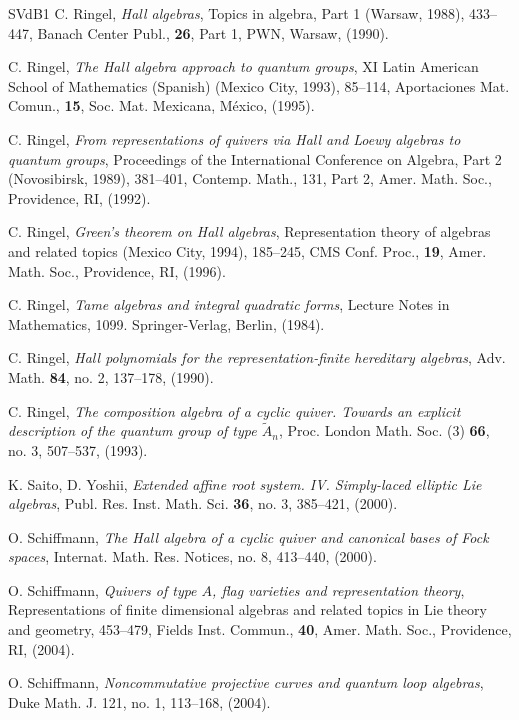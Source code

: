 \documentclass[a4paper,10pt]{amsart}
\numberwithin{equation}{section}
\begin{document}
{{\begin{thebibliography}{SVdB1}
C. Ringel, \emph{Hall algebras}, Topics in algebra, Part 1 (Warsaw, 1988), 433--447, Banach Center Publ., \textbf{26}, Part 1, PWN, Warsaw, (1990).

C. Ringel, \emph{The Hall algebra approach to quantum groups}, XI Latin American School of Mathematics (Spanish) (Mexico City, 1993), 85--114, Aportaciones Mat. Comun., \textbf{15}, Soc. Mat. Mexicana, M\'exico, (1995).

C. Ringel, \emph{From representations of quivers via Hall and Loewy algebras to quantum groups}, Proceedings of the International Conference on Algebra, Part 2 (Novosibirsk, 1989), 381--401, Contemp. Math., 131, Part 2, Amer. Math. Soc., Providence, RI, (1992).

C. Ringel, \emph{Green's theorem on Hall algebras}, Representation theory of algebras and related topics (Mexico City, 1994), 185--245, CMS Conf. Proc., \textbf{19}, Amer. Math. Soc., Providence, RI, (1996).

C. Ringel, \emph{Tame algebras and integral quadratic forms}, Lecture Notes in Mathematics, 1099. Springer-Verlag, Berlin, (1984).

C. Ringel, \emph{Hall polynomials for the representation-finite hereditary algebras}, Adv. Math. \textbf{84}, no. 2, 137--178, (1990).

C. Ringel, \emph{The composition algebra of a cyclic quiver. Towards an explicit description of the quantum group of type $\widetilde{A}_n$}, Proc. London Math. Soc. (3) \textbf{66}, no. 3, 507--537, (1993).

K. Saito, D. Yoshii, \emph{Extended affine root system. IV. Simply-laced elliptic Lie algebras}, Publ. Res. Inst. Math. Sci. \textbf{36}, no. 3, 385--421, (2000).

O. Schiffmann, \emph{The Hall algebra of a cyclic quiver and canonical bases of Fock spaces}, Internat. Math. Res. Notices, no. 8, 413--440, (2000).

O. Schiffmann, \emph{Quivers of type $A$, flag varieties and representation theory}, Representations of finite dimensional algebras and related topics in Lie theory and geometry, 453--479, Fields Inst. Commun., \textbf{40}, Amer. Math. Soc., Providence, RI, (2004).

O. Schiffmann, \emph{Noncommutative projective curves and quantum loop algebras}, Duke Math. J. 121, no. 1, 113--168, (2004).


\end{thebibliography}}}
\end{document}
